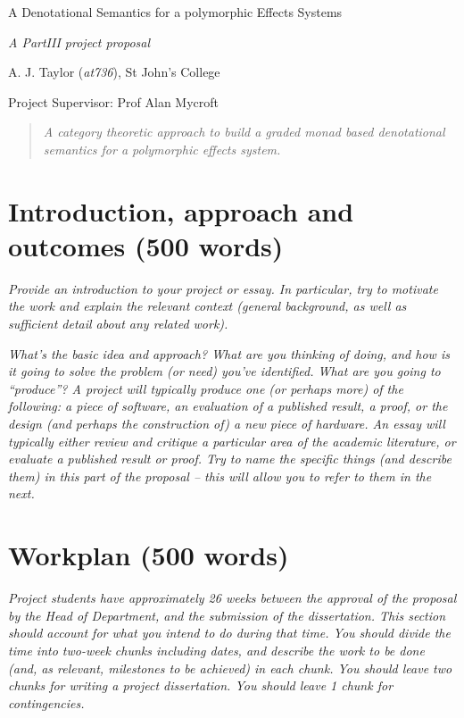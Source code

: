 \documentclass[11pt]{article}
\begin{document}
\centerline{\Large A Denotational Semantics for a polymorphic Effects Systems}
\vspace{2em}
\centerline{\Large \emph{A PartIII project proposal}}
\vspace{2em}
\centerline{\large A. J. Taylor (\emph{at736}), St John's College}
\vspace{1em}
\centerline{\large Project Supervisor: Prof Alan Mycroft}
\vspace{1em}

\begin{abstract}
\textsl{
	A category theoretic approach to build a graded monad based denotational semantics for a polymorphic effects system.
} 
\end{abstract}

\section{Introduction, approach and outcomes (500 words)}

\textsl{Provide an introduction to your project or essay. In particular, try to
  motivate the work and explain the relevant context (general
  background, as well as sufficient detail about any related
  work).}

\textsl{What's the basic idea and approach? What are you thinking of 
doing, and how is it going to solve the problem (or need) you've 
identified. What are you going to ``produce''? 
A project will typically produce one (or perhaps more) of the following:
a piece of software, an evaluation of a published result, a proof, or
the design (and perhaps the construction of) a new piece of hardware. An
essay will typically either review and critique a particular area of the
academic literature, or evaluate a published result or proof. Try to 
name the specific things (and describe them) in this part of the 
proposal -- this will allow you to refer to them in the next.} 

\section{Workplan (500 words)}
\textsl{Project students have approximately 26 weeks between the approval of 
the proposal by the Head of Department, and the submission of the dissertation. This section
should account for what you intend to do during that time. You should divide the time into two-week chunks including dates, and 
describe the work to be done (and, as relevant, milestones to be 
achieved) in each chunk. You should leave two 
chunks for writing a project dissertation. You should leave 1 chunk for contingencies.} 
\end{document}
